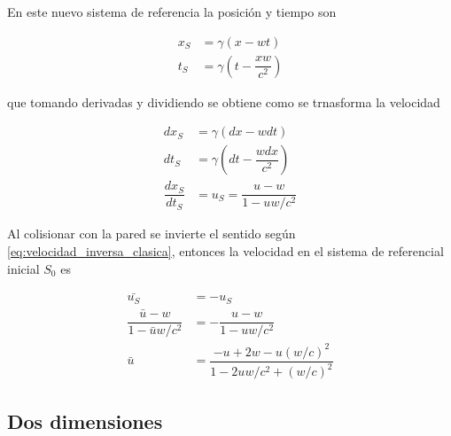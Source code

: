 \documentclass[11pt, spanish]{book}
\begin{document}
\vspace{3mm}

En este nuevo sistema de referencia la posición y tiempo son

\begin{align}\label{eq:tiempo_sistema_muro_reposo}
    x_S &= \gamma(x - wt) \\
    t_S &= \gamma(t - \dfrac{xw}{c^2})
\end{align}

que tomando derivadas y dividiendo se obtiene como se trnasforma la velocidad

\begin{align}
    dx_S &= \gamma\left( dx - w dt \right) \nonumber\\
    dt_S &= \gamma \left( dt - \dfrac{w dx}{c^2} \right) \nonumber \\
    \dfrac{dx_S}{dt_S} &= u_S = \dfrac{u - w}{1 - u w/c^2} \label{eq:transformacion_velocidad_1D} 
\end{align}

\vspace{3mm}

Al colisionar con la pared se invierte el sentido según \ref{eq:velocidad_inversa_clasica}, entonces la velocidad en el sistema de referencial inicial \( S_0 \) es

\begin{align}
    \bar{u_S} &= -u_S \nonumber \\
    \dfrac{\bar{u} - w}{1 - \bar{u} w/c^2} &= -\dfrac{u - w}{1 - u w/c^2} \nonumber \\
    \bar{u} &= \dfrac{-u + 2w - u{(w/c)}^2}{1 - 2uw/c^2 + {(w/c)}^2} \label{eq:nueva_velocidad_1D}
\end{align}

\vspace{3mm}

\subsection{Dos dimensiones}
\end{document}
